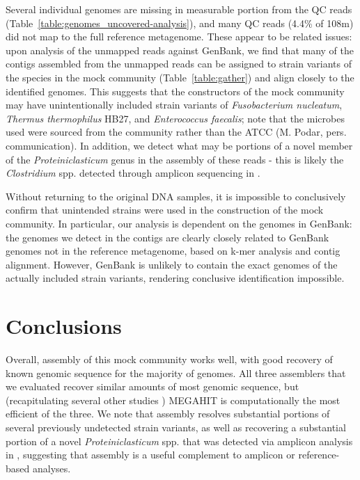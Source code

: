 \documentclass[11pt]{article}
\begin{document}
Several individual genomes are missing in measurable portion from the
QC reads (Table~\ref{table:genomes_uncovered-analysis}), and many QC
reads (4.4\% of 108m) did not map to the full reference metagenome.
These appear to be related issues: upon analysis of the unmapped reads
against GenBank, we find that many of the contigs assembled from the
unmapped reads can be assigned to strain variants of the species in
the mock community (Table~\ref{table:gather}) and align closely
to the identified genomes.  This suggests that the
constructors of the mock community may have unintentionally included
strain variants of {\em Fusobacterium nucleatum}, {\em Thermus
  thermophilus} HB27, and {\em Enterococcus faecalis}; note that the
microbes used were sourced from the community rather than the ATCC
(M. Podar, pers.  communication).  In addition, we detect what may be
portions of a novel member of the {\em Proteiniclasticum} genus in the
assembly of these reads - this is likely the {\em Clostridium} spp. detected
through amplicon sequencing in \cite{podar}.

Without returning to the original DNA samples, it is impossible to
conclusively confirm that unintended strains were used in the
construction of the mock community.  In particular, our analysis is
dependent on the genomes in GenBank: the genomes we detect in the
contigs are clearly closely related to GenBank genomes not in
the reference metagenome, based on k-mer analysis and
contig alignment.  However, GenBank is unlikely to contain the exact
genomes of the actually included strain variants, rendering conclusive
identification impossible.

\section*{Conclusions}

Overall, assembly of this mock community works well, with good
recovery of known genomic sequence for the majority of genomes.  All
three assemblers that we evaluated recover similar amounts of most
genomic sequence, but (recapitulating several other studies \cite{CAMI,Vollmers2017,metag_one})
MEGAHIT is computationally the most efficient of the three.
We note that assembly
resolves substantial portions of several previously undetected strain
variants, as well as recovering a substantial portion of a novel
{\em Proteiniclasticum} spp. that was detected via amplicon analysis
in \cite{podar}, suggesting that assembly is a useful complement to amplicon
or reference-based analyses.
\end{document}
